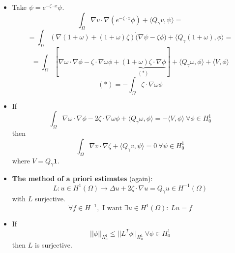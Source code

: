 \documentclass{article}
\begin{document}
\begin{itemize}
    \item Take $\psi = e^{-\zeta \cdot x} \psi$.
    \begin{equation}
        \int_\Omega \nabla v \cdot \nabla (e^{-\zeta \cdot x} \phi) + \langle Q_\gamma v, \psi \rangle = 
    \end{equation}
    \begin{equation}
        = \int_\Omega (\nabla (1+\omega) + (1+\omega) \zeta) \dot (\nabla \psi - \zeta \phi) + \langle Q_\gamma (1+\omega), \phi \rangle =
    \end{equation}
    \begin{equation}
        = \int_\Omega [\nabla \omega \cdot \nabla \phi - \zeta \cdot \nabla \omega \phi +\underbrace{ (1+\omega) \zeta \cdot \nabla \phi}_{(*)}] + \langle Q_\gamma \omega, \phi \rangle + \langle V, \phi\rangle 
    \end{equation}
    \begin{equation}
        (*) = - \int_\Omega \zeta \cdot \nabla \omega \phi
    \end{equation}

    \item If 
    \begin{equation}
        \boxed{\int_\Omega \nabla \omega \cdot \nabla \phi - 2 \zeta \cdot \nabla \omega \phi + \langle Q_\gamma \omega, \phi \rangle = - \langle V, \phi \rangle \ \forall \phi \in H_0^1}
    \end{equation}
    then
    \begin{equation}
        \int_\Omega \nabla v \cdot \nabla \zeta + \langle Q_\gamma v, \psi\rangle = 0 \ \forall \psi \in H_0^1
    \end{equation}
    where $V = Q_\gamma \mathbf{1}$.

    \item \textbf{The method of a priori estimates} (again):
    \begin{equation}
        L: u \in H^1(\Omega) \rightarrow \Delta u + 2 \zeta \cdot \nabla u = Q_\gamma u \in H^{-1}(\Omega)
    \end{equation}
    with $L$ surjective.
    \begin{equation}
        \forall f \in H^{-1}, \text{ I want } \exists u \in H^1(\Omega): \ Lu = f
    \end{equation}

    \item If
    \begin{equation}
        ||\phi||_{H_0^1} \leq ||L^T \phi||_{H_0^1} \ \forall \phi \in H_0^1
    \end{equation}
    then $L$ is surjective.
    
    
\end{itemize}
\end{document}
